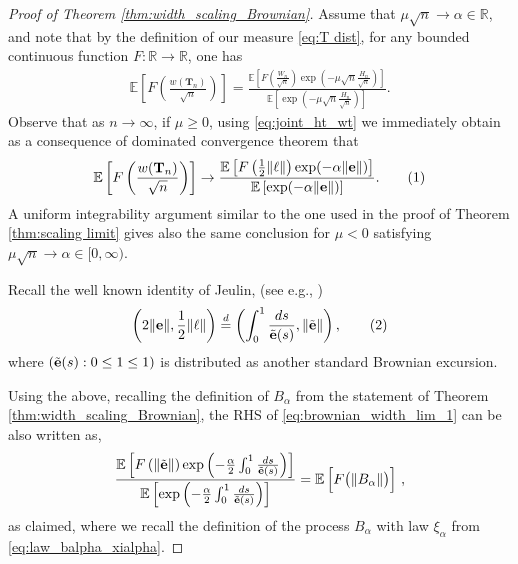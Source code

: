 \documentclass{article}
\newcommand{\E}{\mathbb{E}}								%
\newcommand{\Exp}[1]{\E\left[#1\right]}					%
\newcommand{\1}{\mathbbm{1}}								%
\newcommand\numberthis{\addtocounter{equation}{1}\tag{\theequation}}
\theoremstyle{definition}
\numberwithin{equation}{section}
\newcommand{\R}{\mathbb R}
\begin{document}
\begin{proof}[Proof of Theorem \ref{thm:width_scaling_Brownian}]
    

Assume that $\mu \sqrt{n} \to \alpha \in \R$, and note that by the definition of our measure \eqref{eq:T dist}, for any bounded continuous function $F:\R \to \R$, one has
\begin{align*}
    \Exp{F\left(\frac{w(\mathbf{T}_n)}{\sqrt{n}}\right)}=\frac{\Exp{F\left(\frac{W_n}{\sqrt{n}}\right)\exp\left(-\mu\sqrt{n}\frac{H_n}{\sqrt{n}}\right)}}{\Exp{\exp\left(-\mu\sqrt{n}\frac{H_n}{\sqrt{n}}\right)}}.
\end{align*}
Observe that as $n \to \infty$, if $\mu\geq 0$, using \eqref{eq:joint_ht_wt} we immediately obtain as a consequence of dominated convergence theorem that
\begin{align*}
    \Exp{F\left(\frac{w(\mathbf{T}_n)}{\sqrt{n}}\right)}\to \frac{\Exp{F\left(\frac{1}{2}\|\ell\|\right)\exp(-\alpha\|\mathbf{e}\|)}}{\Exp{\exp(-\alpha\|\mathbf{e}\|)}}.\numberthis \label{eq:brownian_width_lim_1}
\end{align*}
A uniform integrability argument similar to the one used in the proof of Theorem \ref{thm:scaling limit} gives also the same conclusion for $\mu<0$ satisfying $\mu \sqrt{n} \to \alpha \in [0,\infty)$.

Recall the well known identity of Jeulin, (see e.g., \cite[Eq. (2.8)]{chassaing2000height})
\begin{align*}
    \left(2\|\mathbf{e}\|,\frac{1}{2}\|\ell\| \right)\stackrel{d}{=} \left(\int_0^1\frac{ds}{\Tilde{\mathbf{e}}(s)},\|\Tilde{\mathbf{e}}\|  \right), \numberthis \label{eq:Jeulin}
\end{align*}
where $(\Tilde{\mathbf{e}}(s):0\leq 1\leq 1)$ is distributed as another standard Brownian excursion.

Using the above, {recalling the definition of $B_\alpha$ from the statement of Theorem \ref{thm:width_scaling_Brownian},} the RHS of \eqref{eq:brownian_width_lim_1} can be also written as,
\begin{align*}
    \frac{\Exp{F\left(\|\Tilde{\mathbf{e}}\|\right)\exp\left(-\frac{\alpha}{2}\int_0^1\frac{ds}{\Tilde{\mathbf{e}}(s)}\right)}}{\Exp{\exp\left(-\frac{\alpha}{2}\int_0^1\frac{ds}{\Tilde{\mathbf{e}}(s)}\right)}}=\Exp{\Big.F\big(\|B_\alpha\|\big)}\,,
\end{align*}
as claimed, {where {we} recall {the definition of the process} $B_\alpha$ with law $\xi_\alpha$ from \eqref{eq:law_balpha_xialpha}}.
\end{proof}
\end{document}
